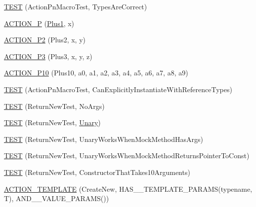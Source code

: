 \begin{DoxyCompactItemize}
\item 
\hyperlink{namespacetesting_1_1gmock__generated__actions__test_ad702feced8b71b3708782b1a2274453e}{T\+E\+ST} (Action\+Pn\+Macro\+Test, Types\+Are\+Correct)
\item 
\hyperlink{namespacetesting_1_1gmock__generated__actions__test_a89c01b82e854ad79e3d139aa72477747}{A\+C\+T\+I\+O\+N\+\_\+P} (\hyperlink{namespacetesting_1_1gmock__generated__actions__test_a75e901c6d28c591c53a54320a294da55}{Plus1}, x)
\item 
\hyperlink{namespacetesting_1_1gmock__generated__actions__test_a0e2768c0fae30bc46ec6e322b29dd54c}{A\+C\+T\+I\+O\+N\+\_\+\+P2} (Plus2, x, y)
\item 
\hyperlink{namespacetesting_1_1gmock__generated__actions__test_afc911947c840aa9857eb2d06e4d80787}{A\+C\+T\+I\+O\+N\+\_\+\+P3} (Plus3, x, y, z)
\item 
\hyperlink{namespacetesting_1_1gmock__generated__actions__test_a4e48e01a7bfc369d279cc0c99a7d3c60}{A\+C\+T\+I\+O\+N\+\_\+\+P10} (Plus10, a0, a1, a2, a3, a4, a5, a6, a7, a8, a9)
\item 
\hyperlink{namespacetesting_1_1gmock__generated__actions__test_a20664d32f08c53d6f9fa5e020a85fab3}{T\+E\+ST} (Action\+Pn\+Macro\+Test, Can\+Explicitly\+Instantiate\+With\+Reference\+Types)
\item 
\hyperlink{namespacetesting_1_1gmock__generated__actions__test_a058a3d17071ddb888319ab71b491af94}{T\+E\+ST} (Return\+New\+Test, No\+Args)
\item 
\hyperlink{namespacetesting_1_1gmock__generated__actions__test_a64f3f8327d51c139b441846e809ae4bc}{T\+E\+ST} (Return\+New\+Test, \hyperlink{namespacetesting_1_1gmock__generated__actions__test_a61f0e6c3f2c07079299f1d6e1667ab92}{Unary})
\item 
\hyperlink{namespacetesting_1_1gmock__generated__actions__test_ad8f696b14b0f2dba4986c53f615aef15}{T\+E\+ST} (Return\+New\+Test, Unary\+Works\+When\+Mock\+Method\+Has\+Args)
\item 
\hyperlink{namespacetesting_1_1gmock__generated__actions__test_ad9f45ddc4a5616b919116c766ad37a30}{T\+E\+ST} (Return\+New\+Test, Unary\+Works\+When\+Mock\+Method\+Returns\+Pointer\+To\+Const)
\item 
\hyperlink{namespacetesting_1_1gmock__generated__actions__test_a1ed6392f4aeb68b9429ff7dd98ce5a86}{T\+E\+ST} (Return\+New\+Test, Constructor\+That\+Takes10\+Arguments)
\item 
\hyperlink{namespacetesting_1_1gmock__generated__actions__test_a1debc0726715951fcd7f5443e436dc46}{A\+C\+T\+I\+O\+N\+\_\+\+T\+E\+M\+P\+L\+A\+TE} (Create\+New, H\+A\+S\+\_\+\_\+\+T\+E\+M\+P\+L\+A\+T\+E\+\_\+\+P\+A\+R\+A\+MS(typename, T), A\+N\+D\+\_\+\_\+\+V\+A\+L\+U\+E\+\_\+\+P\+A\+R\+A\+MS())

\end{DoxyCompactItemize}
